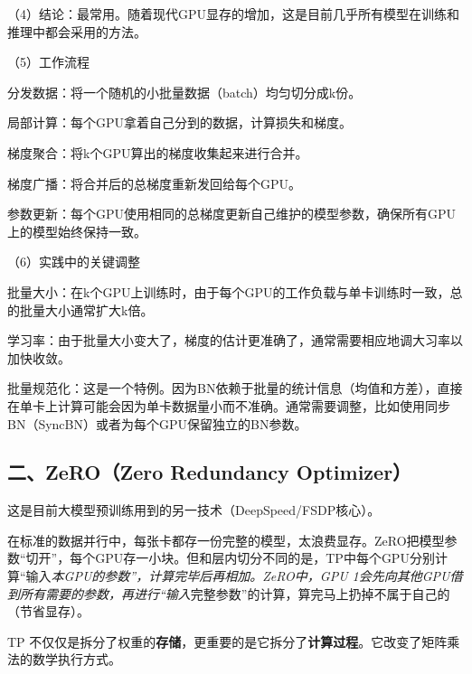 （4）结论：最常用。随着现代GPU显存的增加，这是目前几乎所有模型在训练和推理中都会采用的方法。

（5）工作流程

分发数据：将一个随机的小批量数据（batch）均匀切分成k份。

局部计算：每个GPU拿着自己分到的数据，计算损失和梯度。

梯度聚合：将k个GPU算出的梯度收集起来进行合并。

梯度广播：将合并后的总梯度重新发回给每个GPU。

参数更新：每个GPU使用相同的总梯度更新自己维护的模型参数，确保所有GPU上的模型始终保持一致。

（6）实践中的关键调整

批量大小：在k个GPU上训练时，由于每个GPU的工作负载与单卡训练时一致，总的批量大小通常扩大k倍。

学习率：由于批量大小变大了，梯度的估计更准确了，通常需要相应地调大习率以加快收敛。

批量规范化：这是一个特例。因为BN依赖于批量的统计信息（均值和方差），直接在单卡上计算可能会因为单卡数据量小而不准确。通常需要调整，比如使用同步BN（SyncBN）或者为每个GPU保留独立的BN参数。

\hypertarget{ux4e8czerozero-redundancy-optimizer}{%
\subsection{二、ZeRO（Zero Redundancy Optimizer）}\label{ux4e8czerozero-redundancy-optimizer}}

这是目前大模型预训练用到的另一技术（DeepSpeed/FSDP核心）。

在标准的数据并行中，每张卡都存一份完整的模型，太浪费显存。ZeRO把模型参数``切开''，每个GPU存一小块。但和层内切分不同的是，TP中每个GPU分别计算``输入\emph{本GPU的参数''，计算完毕后再相加。ZeRO中，GPU 1会先向其他GPU借到所有需要的参数，再进行``输入}完整参数''的计算，算完马上扔掉不属于自己的（节省显存）。

TP 不仅仅是拆分了权重的\textbf{存储}，更重要的是它拆分了\textbf{计算过程}。它改变了矩阵乘法的数学执行方式。

